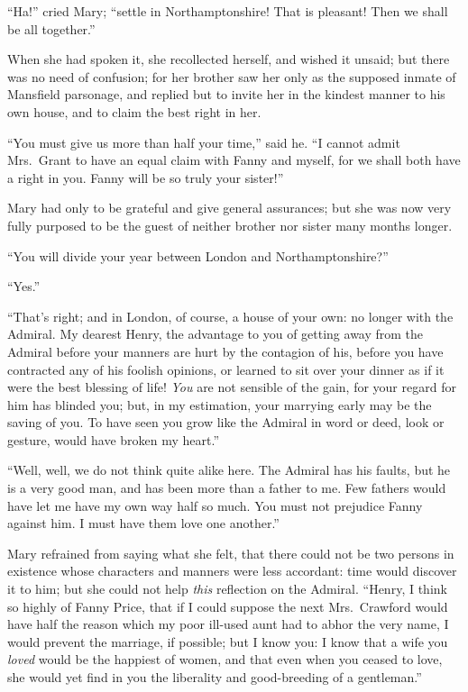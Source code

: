 \documentclass{article}
\begin{document}
``Ha!'' cried Mary; ``settle in Northamptonshire!
That is pleasant!  Then we shall be all together.''

When she had spoken it, she recollected herself,
and wished it unsaid; but there was no need of confusion;
for her brother saw her only as the supposed inmate
of Mansfield parsonage, and replied but to invite her
in the kindest manner to his own house, and to claim
the best right in her.

``You must give us more than half your time,'' said he.
``I cannot admit Mrs.\ Grant to have an equal claim with
Fanny and myself, for we shall both have a right in you.
Fanny will be so truly your sister!''

Mary had only to be grateful and give general assurances;
but she was now very fully purposed to be the guest of
neither brother nor sister many months longer.

``You will divide your year between London and Northamptonshire?''

``Yes.''

``That's right; and in London, of course, a house of
your own:  no longer with the Admiral.  My dearest Henry,
the advantage to you of getting away from the Admiral
before your manners are hurt by the contagion of his,
before you have contracted any of his foolish opinions,
or learned to sit over your dinner as if it were the best
blessing of life!  \emph{You} are not sensible of the gain,
for your regard for him has blinded you; but, in my estimation,
your marrying early may be the saving of you.  To have seen
you grow like the Admiral in word or deed, look or gesture,
would have broken my heart.''

``Well, well, we do not think quite alike here.
The Admiral has his faults, but he is a very good man,
and has been more than a father to me.  Few fathers would
have let me have my own way half so much.  You must
not prejudice Fanny against him.  I must have them love
one another.''

Mary refrained from saying what she felt, that there could
not be two persons in existence whose characters and manners
were less accordant:  time would discover it to him;
but she could not help \emph{this} reflection on the Admiral.
``Henry, I think so highly of Fanny Price, that if I could
suppose the next Mrs.\ Crawford would have half the reason
which my poor ill-used aunt had to abhor the very name,
I would prevent the marriage, if possible; but I know you:
I know that a wife you \emph{loved} would be the happiest
of women, and that even when you ceased to love, she would
yet find in you the liberality and good-breeding of
a gentleman.''
\end{document}
